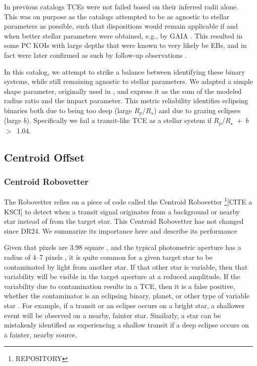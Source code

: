In previous catalogs \citep{Rowe2015cat,Mullally2015cat,Coughlin2016} TCEs were not failed based on their inferred radii alone. This was on purpose as the catalogs attempted to be as agnostic to stellar parameters as possible, such that dispositions would remain applicable if and when better stellar parameters were obtained, e.g., by GAIA \citep{Cacciari2009,Mignard2005}. This resulted in some PC KOIs with large depths that were known to very likely be EBs, and in fact were later confirmed as such by follow-up observations \citep{Santerne2016}.

In this catalog, we attempt to strike a balance between identifying these binary systems, while still remaining agnostic to stellar parameters. We adapted a simple shape parameter, originally used in \citet{Batalha2013}, and express it as the sum of the modeled radius ratio and the impact parameter. This metric reliability identifies eclipsing binaries both due to being too deep (large $R_{p}$/$R_{\star}$) and due to grazing eclipses (large $b$). Specifically we fail a transit-like TCE as a stellar system if $R_{p}$/$R_{\star}$~+~$b$~$>$~1.04.



\subsection{Centroid Offset}
\subsubsection{Centroid Robovetter}
The Robovetter relies on a piece of code called the Centroid Robovetter \footnote{REPOSITORY}\citep{KSCI}[CITE a KSCI] to detect when a transit signal originates from a background or nearby star instead of from the target star. This Centroid Robovetter has not changed since DR24. We summarize its importance here and describe its performance

Given that \keplers{} pixels are 3.98\arcsec{} square \citep{Koch2010}, and the typical photometric aperture has a radius of 4--7 pixels \citep{Bryson2010b}, it is quite common for a given target star to be contaminated by light from another star. If that other star is variable, then that variability will be visible in the target aperture at a reduced amplitude. If the variability due to contamination results in a TCE, then it is a false positive, whether the contaminator is an eclipsing binary, planet, or other type of variable star \citep{Bryson2013}. For example, if a transit or an eclipse occurs on a bright star, a shallower event will be observed on a nearby, fainter star. Similarly, a star can be mistakenly identified as experiencing a shallow transit if a deep eclipse occurs on a fainter, nearby source.

